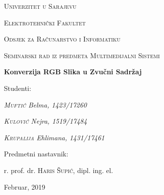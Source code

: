 \begin{titlepage}
	\centering
	{\scshape Univerzitet u Sarajevu \par}
	{\scshape Elektrotehnički Fakultet \par}
	{\scshape Odsjek za Računarstvo i Informatiku \par}
	\vspace{2cm}
	{\Large\scshape Seminarski rad iz predmeta Multimedijalni Sistemi\par}
	\vspace{2.5cm}
	{\huge\bfseries Konverzija RGB Slika u Zvučni Sadržaj\par}
	\vspace{2.5cm}
	\Large Studenti: \par
	{\Large\itshape \textsc{Muftić} Belma, 1423/17260\par}
	{\Large\itshape \textsc{Kulović} Nejra, 1519/17484\par}
	{\Large\itshape \textsc{Krupalija} Ehlimana, 1431/17461\par}
	\vfill
	Predmetni nastavnik:\par
	r. prof. dr. \textsc{Haris Šupić}, dipl. ing. el.
	\vfill
	{\large Februar, 2019\par}
\end{titlepage}

